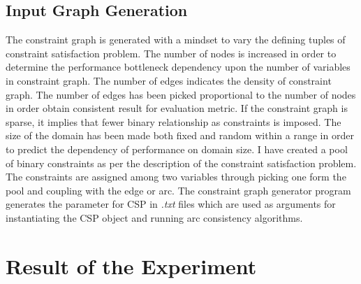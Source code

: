 \documentclass[10pt,twocolumn]{article}
\begin{document}
\subsection{Input Graph Generation}
The constraint graph is generated with a mindset to vary the defining tuples of constraint satisfaction problem. The number of nodes is increased in order to determine the performance bottleneck dependency upon the number of variables in constraint graph. The number of edges indicates the density of constraint graph. The number of edges has been picked proportional to the number of nodes in order obtain consistent result for evaluation metric. If the constraint graph is sparse, it implies that fewer binary relationship as constraints is imposed. The size of the domain has been made both fixed and random within a range in order to predict the dependency of performance on domain size. I have created a pool of binary constraints as per the description of the constraint satisfaction problem. The constraints are assigned among two variables through picking one form the pool and coupling with the edge or arc. The constraint graph generator program generates the parameter for CSP in \textit{.txt} files which are used as arguments for instantiating the CSP object and running arc consistency algorithms.
\section{Result of the Experiment}
\end{document}
